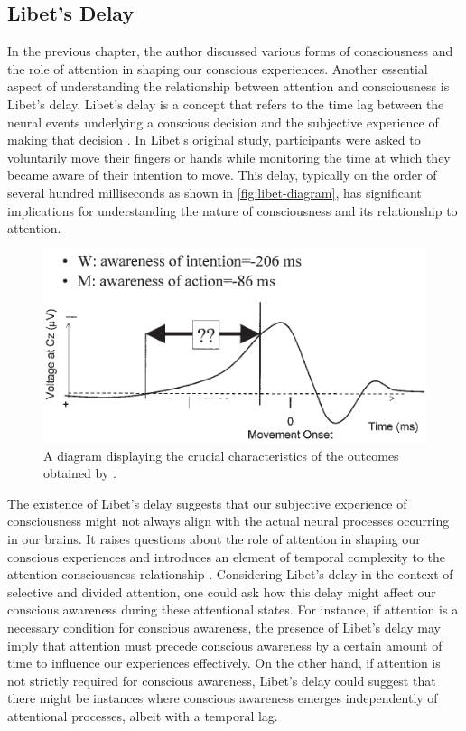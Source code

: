 \documentclass[10pt]{article}
\begin{document}
\begin{sloppypar}
  \subsection{Libet’s Delay}
  \label{sec:libet}

  In the previous chapter, the author discussed various forms of consciousness and the role of attention in shaping our conscious experiences. Another essential aspect of understanding the relationship between attention and consciousness is Libet’s delay. Libet’s delay is a concept that refers to the time lag between the neural events underlying a conscious decision and the subjective experience of making that decision \citep{libet_time_1983}. In Libet's original study, participants were asked to voluntarily move their fingers or hands while monitoring the time at which they became aware of their intention to move. This delay, typically on the order of several hundred milliseconds as shown in \autoref{fig:libet-diagram}, has significant implications for understanding the nature of consciousness and its relationship to attention.

  \begin{figure}[ht]
    \centering
    \includegraphics[width=\textwidth]{figures/libet.png}
    \caption[A diagram displaying the crucial characteristics of the outcomes obtained by Libet et al.]{A diagram displaying the crucial characteristics of the outcomes obtained by \cite{libet_time_1983} \citep{haggard_conscious_2001}.}
    \label{fig:libet-diagram}
  \end{figure}

  The existence of Libet’s delay suggests that our subjective experience of consciousness might not always align with the actual neural processes occurring in our brains. It raises questions about the role of attention in shaping our conscious experiences and introduces an element of temporal complexity to the attention-consciousness relationship \citep{dijksterhuis_goals_2010}. Considering Libet’s delay in the context of selective and divided attention, one could ask how this delay might affect our conscious awareness during these attentional states. For instance, if attention is a necessary condition for conscious awareness, the presence of Libet’s delay may imply that attention must precede conscious awareness by a certain amount of time to influence our experiences effectively. On the other hand, if attention is not strictly required for conscious awareness, Libet’s delay could suggest that there might be instances where conscious awareness emerges independently of attentional processes, albeit with a temporal lag.


\end{sloppypar}
\end{document}
